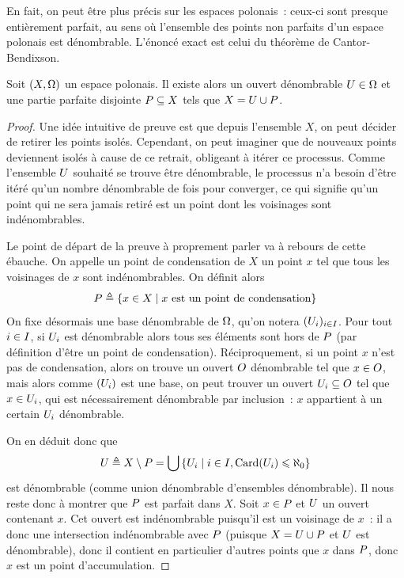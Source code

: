 En fait, on peut être plus précis sur les espaces polonais~: ceux-ci sont
presque entièrement parfait, au sens où l'ensemble des points non parfaits d'un
espace polonais est dénombrable. L'énoncé exact est celui du théorème de
Cantor-Bendixson.

\begin{theorem}\label{thm.cantor.bend}
  Soit $(X,\Omega)$ un espace polonais. Il existe alors un ouvert dénombrable
  $U\in \Omega$ et une partie parfaite disjointe $P\subseteq X$ tels
  que $X = U \cup P$.
\end{theorem}

\begin{proof}
  Une idée intuitive de preuve est que depuis l'ensemble $X$, on peut décider
  de retirer les points isolés. Cependant, on peut imaginer que de nouveaux
  points deviennent isolés à cause de ce retrait, obligeant à itérer ce
  processus. Comme l'ensemble $U$ souhaité se trouve être dénombrable, le
  processus n'a besoin d'être itéré qu'un nombre dénombrable de fois pour
  converger, ce qui signifie qu'un point qui ne sera jamais retiré est un point
  dont les voisinages sont indénombrables.

  Le point de départ de la preuve à proprement parler va à rebours de cette
  ébauche. On appelle un point de condensation de $X$ un point $x$ tel que
  tous les voisinages de $x$ sont indénombrables. On définit alors
  \[P \triangleq \left\{ x \in X \;\middle\vert\; x\text{ est un point de condensation} \right\}\]
  On fixe désormais une base dénombrable de $\Omega$, qu'on notera
  $(U_i)_{i\in I}$. Pour tout $i\in I$, si $U_i$ est
  dénombrable alors tous ses éléments sont hors de $P$ (par définition
  d'être un point de condensation). Réciproquement, si un point $x$ n'est pas de
  condensation, alors on trouve un ouvert $O$ dénombrable tel que
  $x\in O$, mais alors comme $(U_i)$ est une base, on peut trouver un
  ouvert $U_i\subseteq O$ tel que $x\in U_i$, qui est
  nécessairement dénombrable par inclusion~: $x$ appartient à un certain
  $U_i$ dénombrable.

  On en déduit donc que
  \[U \triangleq X\setminus P =
  \bigcup\left\{ U_i \;\middle\vert\; i\in I, \operatorname{Card}(U_i)\leqslant\aleph_0 \right\}\]
  est dénombrable (comme union dénombrable d'ensembles dénombrable). Il nous
  reste donc à montrer que $P$ est parfait dans $X$. Soit $x\in P$
  et $U$ un ouvert contenant $x$. Cet ouvert est indénombrable puisqu'il
  est un voisinage de $x$~: il a donc une intersection indénombrable avec
  $P$ (puisque $X = U \cup P$ et $U$ est dénombrable),
  donc il contient en particulier d'autres points que $x$ dans $P$, donc
  $x$ est un point d'accumulation.
\end{proof}

